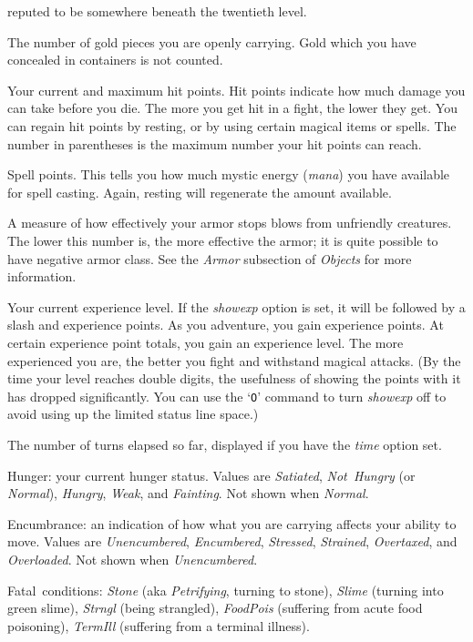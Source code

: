 reputed to be somewhere beneath the twentieth level.
\item[\bb{Gold}]
The number of gold pieces you are openly carrying.  Gold which you have
concealed in containers is not counted.
\item[\bb{Hit Points}]
Your current and maximum hit points.  Hit points indicate how much
damage you can take before you die.  The more you get hit in a fight,
the lower they get.  You can regain hit points by resting, or by using
certain magical items or spells.  The number in parentheses is the maximum
number your hit points can reach.
\item[\bb{Power}]
Spell points.  This tells you how much mystic energy ({\it mana\/})
you have available for spell casting.  Again, resting will regenerate the
amount available.
\item[\bb{Armor Class}]
A measure of how effectively your armor stops blows from unfriendly
creatures.  The lower this number is, the more effective the armor; it
is quite possible to have negative armor class.
See the {\it Armor\/} subsection of {\it Objects\/} for more information.
\item[\bb{Experience}]
Your current experience level.
If the {\it showexp\/}
option is set, it will be followed by a slash and experience points.
As you adventure, you gain experience points.
At certain experience point totals, you gain an experience level.
The more experienced you are, the better you fight and withstand magical
attacks.
(By the time your level reaches double digits, the usefulness of showing
the points with it has dropped significantly.
You can use the `{\tt O}' command to turn {\it showexp\/}
off to avoid using up the limited status line space.)
\item[\bb{Time}]
The number of turns elapsed so far, displayed if you have the
{\it time\/} option set.
\item[\bb{Status}]
Hunger:
your current hunger status.
Values are {\it Satiated}, {\it Not~Hungry\/} (or {\it Normal\/}),
{\it Hungry}, {\it Weak}, and {\it Fainting}.
Not shown when {\it Normal}.

Encumbrance:
an indication of how what you are carrying affects your ability to move.
Values are {\it Unencumbered}, {\it Encumbered}, {\it Stressed},
{\it Strained}, {\it Overtaxed}, and {\it Overloaded}.
Not shown when {\it Unencumbered}.

Fatal~conditions:
{\it Stone\/} (aka {\it Petrifying}, turning to stone),
{\it Slime\/} (turning into green slime),
{\it Strngl\/} (being strangled),
{\it FoodPois\/} (suffering from acute food poisoning),
{\it TermIll\/} (suffering from a terminal illness).

